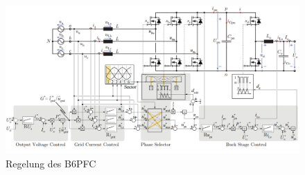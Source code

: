 \begin{figure}
\centering
\includegraphics[width=0.9\linewidth]{content/Grafiken/B6-Control-orig}
\caption[Regelung des \gls{B6PFC}]{Regelung des \gls{B6PFC} \cite{13PWMPFC}}
\label{fig:b6-control-orig}
\end{figure}
